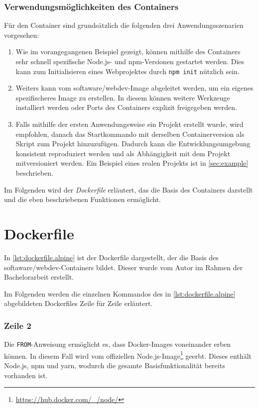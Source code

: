\subsubsection{Verwendungsmöglichkeiten des Containers}
Für den Container sind grundsätzlich die folgenden drei Anwendungsszenarien vorgesehen:

\begin{enumerate}
    \item Wie im vorangegangenen Beispiel gezeigt, können mithilfe des Containers sehr schnell spezifische Node.js- und npm-Versionen gestartet werden.
        Dies kann \zB zum Initialisieren eines Webprojektes durch \verb|npm init| nützlich sein.
    \item Weiters kann vom softaware/webdev-Image abgeleitet werden, um ein eigenes spezifischeres Image zu erstellen.
        In diesem können \zB weitere Werkzeuge installiert werden oder Ports des Containers explizit freigegeben werden. 
    \item Falls mithilfe der ersten Anwendungsweise ein Projekt erstellt wurde, wird empfohlen, danach das Startkommando mit derselben Containerversion als Skript zum Projekt hinzuzufügen.
        Dadurch kann die Entwicklungsumgebung konsistent reproduziert werden und als Abhängigkeit mit dem Projekt mitversioniert werden.
        Ein Beispiel eines realen Projekts ist in \cref{sec:example} beschrieben.
\end{enumerate}
Im Folgenden wird der \emph{Dockerfile} erläutert, das die Basis des Containers darstellt und die eben beschriebenen Funktionen ermöglicht.

\section{Dockerfile}
\label{sec:dockerfile}
In \cref{lst:dockerfile.alpine} ist der Dockerfile dargestellt, der die Basis des softaware/webdev-Containers bildet.
Dieser wurde vom Autor im Rahmen der Bachelorarbeit erstellt.


Im Folgenden werden die einzelnen Kommandos des in \cref{lst:dockerfile.alpine} abgebildeten Dockerfiles Zeile für Zeile erläutert.

\subsubsection{Zeile 2}
Die \verb|FROM|-Anweisung ermöglicht es, dass Docker-Images voneinander erben können.
In diesem Fall wird vom offiziellen Node.js-Image\footnote{\url{https://hub.docker.com/_/node/}} geerbt.
Dieses enthält Node.js, npm und yarn, wodurch die gesamte Basisfunktionalität bereits vorhanden ist.

